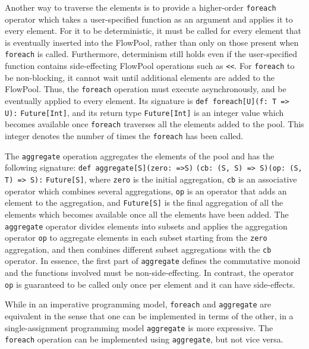 Another way to traverse the elements is to provide a higher-order
\verb=foreach= operator which takes a user-specified function as an argument
and applies it to every element. For it to be deterministic, it must be called
for every element that is eventually inserted into the FlowPool, rather than
only on those present when \verb=foreach= is called. Furthermore, determinism
still holds even if the user-specified function contains side-effecting
FlowPool operations such as \texttt{<<}. For \verb=foreach= to be
non-blocking, it cannot wait until additional elements are added to the
FlowPool. Thus, the \verb=foreach= operation must execute
asynchronously, and be eventually applied to every element. Its signature is
\verb+def foreach[U](f: T => U):+ \verb+Future[Int]+, and its  return type
\verb=Future[Int]= is an integer value which becomes available once
\verb=foreach= traverses all the elements added to the pool. This integer
denotes the number of times the \verb=foreach= has been called.


The \verb=aggregate= operation aggregates the elements of the pool
and has the following signature: \verb+def aggregate[S]+\verb+(zero: =>S)+
\verb+(cb: (S, S) => S)+\verb+(op: (S, T) => S):+ \verb+Future[S]+,
where \verb=zero= is the initial aggregation, \verb=cb= is an
associative operator which combines several aggregations, \verb=op= is
an operator that adds an element to the aggregation, and
\verb=Future[S]= is the final aggregation of all the elements which
becomes available once all the elements have been added.
The \verb=aggregate= operator divides elements into subsets and applies the
aggregation operator \verb=op= to aggregate elements in each subset
starting from the \verb=zero= aggregation, and then combines
different subset aggregations with the \verb=cb= operator.
In essence, the first part of \verb=aggregate= defines the commutative
monoid and the functions involved must be non-side-effecting.
In contrast, the operator \verb=op= is guaranteed to be called only once per
element and it can have side-effects.

While in an imperative programming model, \verb=foreach= and \verb=aggregate= are
equivalent in the sense that one can be implemented in terms of the
other, in a single-assignment programming model \verb=aggregate= is more
expressive.
The \verb=foreach= operation can be implemented using \verb=aggregate=, but not vice versa.


